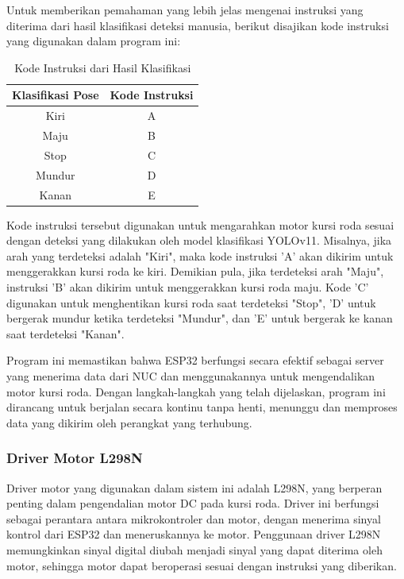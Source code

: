 Untuk memberikan pemahaman yang lebih jelas mengenai instruksi yang diterima dari hasil klasifikasi deteksi manusia, berikut disajikan kode instruksi yang digunakan dalam program ini:
\begin{table}[H]
\centering
\caption{Kode Instruksi dari Hasil Klasifikasi}
\begin{tabular}{|c|c|}
\hline
\textbf{Klasifikasi Pose} & \textbf{Kode Instruksi} \\
\hline
Kiri & A \\
\hline
Maju & B \\
\hline
Stop & C \\
\hline
Mundur & D \\
\hline
Kanan & E \\
\hline
\end{tabular}
\end{table}

Kode instruksi tersebut digunakan untuk mengarahkan motor kursi roda sesuai dengan deteksi yang dilakukan oleh model klasifikasi YOLOv11. Misalnya, jika arah yang terdeteksi adalah "Kiri", maka kode instruksi 'A' akan dikirim untuk menggerakkan kursi roda ke kiri. Demikian pula, jika terdeteksi arah "Maju", instruksi 'B' akan dikirim untuk menggerakkan kursi roda maju. Kode 'C' digunakan untuk menghentikan kursi roda saat terdeteksi "Stop", 'D' untuk bergerak mundur ketika terdeteksi "Mundur", dan 'E' untuk bergerak ke kanan saat terdeteksi "Kanan".

Program ini memastikan bahwa ESP32 berfungsi secara efektif sebagai server yang menerima data dari NUC dan menggunakannya untuk mengendalikan motor kursi roda. Dengan langkah-langkah yang telah dijelaskan, program ini dirancang untuk berjalan secara kontinu tanpa henti, menunggu dan memproses data yang dikirim oleh perangkat yang terhubung.

\subsubsection{Driver Motor L298N}
\label{subsubsec:drivermotor}
Driver motor yang digunakan dalam sistem ini adalah L298N, yang berperan penting dalam pengendalian motor DC pada kursi roda. Driver ini berfungsi sebagai perantara antara mikrokontroler dan motor, dengan menerima sinyal kontrol dari ESP32 dan meneruskannya ke motor. Penggunaan driver L298N memungkinkan sinyal digital diubah menjadi sinyal yang dapat diterima oleh motor, sehingga motor dapat beroperasi sesuai dengan instruksi yang diberikan.

